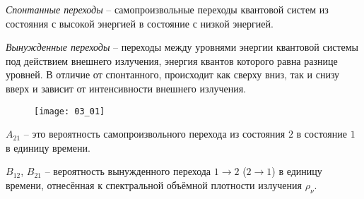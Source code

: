 

\emph{Спонтанные переходы} -- самопроизвольные переходы квантовой систем 
из состояния с высокой энергией в состояние с низкой энергией.

\emph{Вынужденные переходы} -- переходы между уровнями энергии квантовой 
системы под действием внешнего излучения, энергия квантов которого равна 
разнице уровней. В отличие от спонтанного, происходит как сверху вниз, так 
и снизу вверх и зависит от интенсивности внешнего излучения.


\begin{figure}[h!]
	\center
	\texttt{[image: 03\_01]} \\
	\label{img3.1}
\end{figure}

\( A_{21} \) -- это вероятность самопроизвольного перехода из состояния 
\( 2 \) в состояние \( 1 \) в единицу времени. 

\( B_{12} \), \( B_{21} \) -- вероятность вынужденного перехода 
\( 1 \rightarrow 2 \) (\( 2 \rightarrow 1 \)) в единицу времени, отнесённая к 
спектральной объёмной плотности излучения \( \rho_\nu \).
